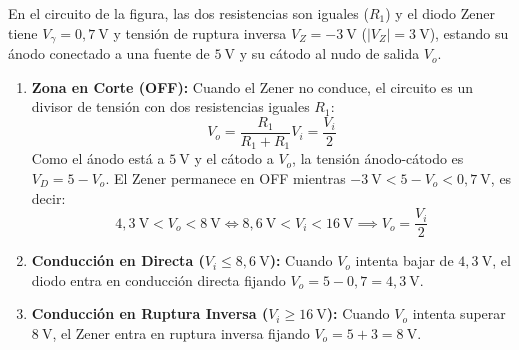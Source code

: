 \begin{ejemplo}
En el circuito de la figura, las dos resistencias son iguales ($R_1$) y el diodo Zener tiene $V_\gamma = 0{,}7\ \si{\volt}$ y tensión de ruptura inversa $V_Z = -3\ \si{\volt}$ ($|V_Z| = 3\ \si{\volt}$), estando su ánodo conectado a una fuente de $5\ \si{\volt}$ y su cátodo al nudo de salida $V_o$.

\begin{center}
\end{center}

\begin{enumerate}[leftmargin=*]
    \item \textbf{Zona en Corte (OFF):} Cuando el Zener no conduce, el circuito es un divisor de tensión con dos resistencias iguales $R_1$:
    \begin{equation}
        V_o = \frac{R_1}{R_1 + R_1} V_i = \frac{V_i}{2}
    \end{equation}
    Como el ánodo está a $5\ \si{\volt}$ y el cátodo a $V_o$, la tensión ánodo-cátodo es $V_D = 5 - V_o$. El Zener permanece en OFF mientras $-3\ \si{\volt} < 5 - V_o < 0{,}7\ \si{\volt}$, es decir:
    \begin{equation}
        4{,}3\ \si{\volt} < V_o < 8\ \si{\volt} \iff 8{,}6\ \si{\volt} < V_i < 16\ \si{\volt} \implies V_o = \frac{V_i}{2}
    \end{equation}
    \item \textbf{Conducción en Directa ($V_i \le 8{,}6\ \si{\volt}$):} Cuando $V_o$ intenta bajar de $4{,}3\ \si{\volt}$, el diodo entra en conducción directa fijando $V_o = 5 - 0{,}7 = 4{,}3\ \si{\volt}$.
    \item \textbf{Conducción en Ruptura Inversa ($V_i \ge 16\ \si{\volt}$):} Cuando $V_o$ intenta superar $8\ \si{\volt}$, el Zener entra en ruptura inversa fijando $V_o = 5 + 3 = 8\ \si{\volt}$.
\end{enumerate}
\end{ejemplo}

